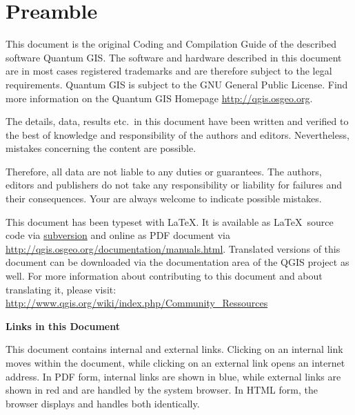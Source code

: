 
\thispagestyle{empty}


\section*{Preamble}


\vspace{1cm}

This document is the original Coding and Compilation Guide of the described 
software Quantum GIS. The software and hardware described in this 
document are in most cases registered trademarks and are therefore subject 
to the legal requirements. Quantum GIS is subject to the GNU General Public 
License. Find more information on the Quantum GIS Homepage
\url{http://qgis.osgeo.org}.

The details, data, results etc.~in this document have been 
written and verified to the best of knowledge and responsibility of the 
authors and editors. Nevertheless, mistakes concerning the content are possible.

Therefore, all data are not liable to any duties or guarantees. The authors, editors 
and publishers do not take any responsibility or liability for failures and 
their consequences. Your are always welcome to indicate possible mistakes.

This document has been typeset with \LaTeX. It is available as \LaTeX~source
code via \href{http://www.qgis.org/wiki/index.php/Manual_Writing}{subversion} 
and online as PDF document via \url{http://qgis.osgeo.org/documentation/manuals.html}. 
Translated versions of this document can be downloaded via the documentation 
area of the QGIS project as well. For more information about contributing to
this document and about translating it, please visit: 
\url{http://www.qgis.org/wiki/index.php/Community_Ressources} 

\vspace{0.5cm}

\textbf{Links in this Document}

This document contains internal and external links.  Clicking on an
internal link moves within the document, while clicking on an external link
opens an internet address.  In PDF form, internal links are shown in blue,
while external links are shown in red and are handled by the
system browser. In HTML form, the browser displays and handles both
identically. 

